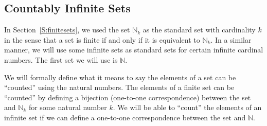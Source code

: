 \subsection*{Countably Infinite Sets}
In Section~\ref{S:finitesets}, we used the set $\mathbb{N}_k$ as the standard set with cardinality $k$ in the sense that a set is finite if and only if it is equivalent to 
$\mathbb{N}_k$.  In a similar manner, we will use some infinite sets as standard sets for certain infinite cardinal numbers.  The first set we will use is $\mathbb{N}$.  

We will formally define what it means to say the elements of a set can be ``counted'' using the natural numbers.  The elements of a finite set can be ``counted'' by defining a bijection (one-to-one correspondence) between the set and $\mathbb{N}_k$ for some natural number $k$.  We will be able to ``count'' the elements of an infinite set if we can define a one-to-one correspondence between the set and $\mathbb{N}$.

